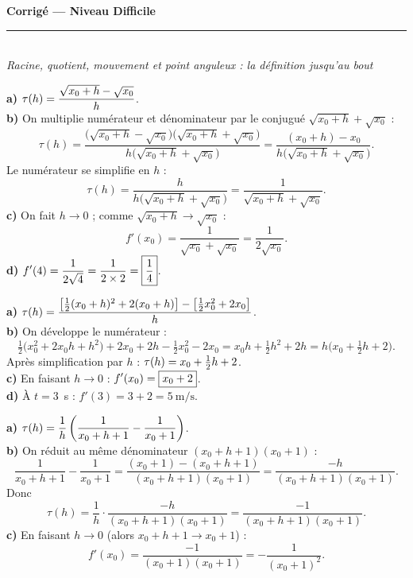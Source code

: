 \pagestyle{fancy}\fancyhf{}
\fancyfoot[C]{\small\thepage}
\renewcommand{\headrulewidth}{0.8pt}



\begin{center}
{\LARGE\bfseries\color{primarydark} Corrigé — Niveau Difficile}\\[2pt]
{\color{primary}\rule{0.5\textwidth}{1.2pt}}\\[4pt]
{\small\itshape Racine, quotient, mouvement et point anguleux : la définition jusqu'au bout}
\end{center}
\vspace{2mm}

\begin{corr}[1 --- $f(x)=\sqrt{x}$, $x_0>0$]
\textbf{a)} $\displaystyle \tau(h)=\frac{\sqrt{x_0+h}-\sqrt{x_0}}{h}$.\\[3pt]
\textbf{b)} On multiplie numérateur et dénominateur par le conjugué
$\sqrt{x_0+h}+\sqrt{x_0}$ :
\[
\tau(h)=\frac{\big(\sqrt{x_0+h}-\sqrt{x_0}\big)\big(\sqrt{x_0+h}+\sqrt{x_0}\big)}
{h\big(\sqrt{x_0+h}+\sqrt{x_0}\big)}
=\frac{(x_0+h)-x_0}{h\big(\sqrt{x_0+h}+\sqrt{x_0}\big)}.
\]
Le numérateur se simplifie en $h$ :
\[
\tau(h)=\frac{h}{h\big(\sqrt{x_0+h}+\sqrt{x_0}\big)}
=\frac{1}{\sqrt{x_0+h}+\sqrt{x_0}}.
\]
\textbf{c)} On fait $h\to 0$ ; comme $\sqrt{x_0+h}\to\sqrt{x_0}$ :
\[
f'(x_0)=\frac{1}{\sqrt{x_0}+\sqrt{x_0}}=\boxed{\frac{1}{2\sqrt{x_0}}}.
\]
\textbf{d)} $\displaystyle f'(4)=\frac{1}{2\sqrt{4}}=\frac{1}{2\times 2}=\boxed{\frac{1}{4}}$.
\end{corr}

\begin{corr}[2 --- mobile MRUA, $f(x)=\tfrac{1}{2}x^2+2x$]
\textbf{a)} $\displaystyle \tau(h)=\frac{\big[\tfrac12(x_0+h)^2+2(x_0+h)\big]
-\big[\tfrac12 x_0^2+2x_0\big]}{h}$.\\[3pt]
\textbf{b)} On développe le numérateur :
\[
\tfrac12\big(x_0^2+2x_0h+h^2\big)+2x_0+2h-\tfrac12 x_0^2-2x_0
=x_0h+\tfrac12 h^2+2h=h\Big(x_0+\tfrac12 h+2\Big).
\]
Après simplification par $h$ : $\displaystyle \tau(h)=x_0+\tfrac12 h+2$.\\[3pt]
\textbf{c)} En faisant $h\to 0$ : $\displaystyle f'(x_0)=\boxed{x_0+2}$.\\[3pt]
\textbf{d)} À $t=3$~s : $f'(3)=3+2=\boxed{5\ \text{m/s}}$.
\end{corr}

\begin{corr}[3 --- $f(x)=\tfrac{1}{x+1}$, $x_0\neq -1$]
\textbf{a)} $\displaystyle \tau(h)=\frac{1}{h}\left(\frac{1}{x_0+h+1}-\frac{1}{x_0+1}\right)$.\\[3pt]
\textbf{b)} On réduit au même dénominateur $(x_0+h+1)(x_0+1)$ :
\[
\frac{1}{x_0+h+1}-\frac{1}{x_0+1}
=\frac{(x_0+1)-(x_0+h+1)}{(x_0+h+1)(x_0+1)}
=\frac{-h}{(x_0+h+1)(x_0+1)}.
\]
Donc
\[
\tau(h)=\frac{1}{h}\cdot\frac{-h}{(x_0+h+1)(x_0+1)}
=\frac{-1}{(x_0+h+1)(x_0+1)}.
\]
\textbf{c)} En faisant $h\to 0$ (alors $x_0+h+1\to x_0+1$) :
\[
f'(x_0)=\frac{-1}{(x_0+1)(x_0+1)}=\boxed{-\frac{1}{(x_0+1)^2}}.
\]
\end{corr}

